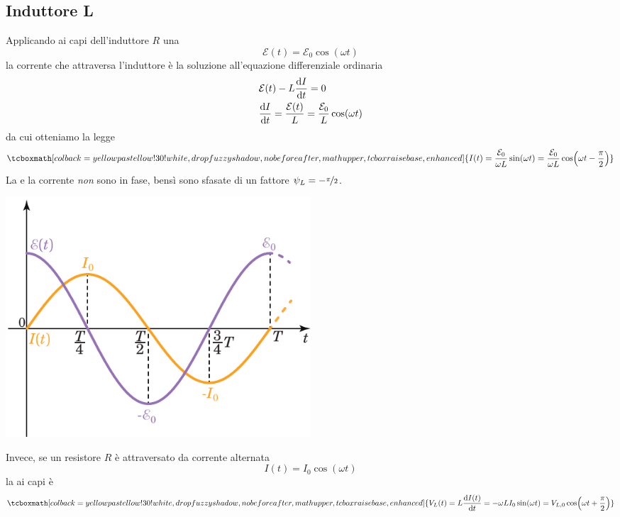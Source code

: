 \subsection{Induttore L}
	\begin{center}		
\end{center}
Applicando ai capi dell'induttore $R$ una \fem
\begin{equation*}
	\mathcal{E}(t)=\mathcal{E}_0\cos(\omega t)
\end{equation*}
la corrente che attraversa l'induttore è la soluzione all'equazione differenziale ordinaria
\begin{align*}
	&\mathcal{E}(t)-L\dv{I}{t}=0\\
	&\dv{I}{t}=\frac{\mathcal{E}(t)}{L}=\frac{\mathcal{E}_0}{L}\cos(\omega t)
\end{align*}
da cui otteniamo la legge
\begin{equation}
	\tcboxmath[colback=yellowpastellow!30!white,drop fuzzy shadow, nobeforeafter, math upper, tcbox raise base, enhanced]{I(t)=\frac{\mathcal{E}_0}{\omega L}\sin(\omega t)=\frac{\mathcal{E}_0}{\omega L}\cos(\omega t-\frac{\pi}{2})}
\end{equation}
La \fem e la corrente \textit{non} sono in fase, bensì sono sfasate di un fattore $\psi_L=-\nicefrac{\pi}{2}$.
\begin{center}
	\includegraphics[width=0.5\textwidth]{images/chp11/chp11Lsymbgraf1.pdf}
\end{center}
Invece, se un resistore $R$ è attraversato da corrente alternata 
\begin{equation*}
	I(t)=I_0\cos(\omega t)
\end{equation*}
la \ddp ai capi è
\begin{equation}
	\tcboxmath[colback=yellowpastellow!30!white,drop fuzzy shadow, nobeforeafter, math upper, tcbox raise base, enhanced]{V_L(t)=L\dv{I(t)}{t}=-\omega L I_0\sin(\omega t)=V_{L,0}\cos(\omega t+\frac{\pi}{2})}
\end{equation}
